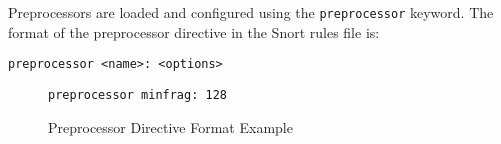 \documentclass[english]{report}
\newenvironment{note}{
\samepage
    \vspace{10pt}{\textsf{
        {\hspace{7pt}\Huge{$\triangle$\hspace{-12.5pt}{\Large{$^!$}}}}\hspace{5pt}
        {\Large{NOTE}}
    }
    }
   \begin{center}
    \par\vspace{-17pt}

    \begin{lrbox}{\savepar}
    \begin{minipage}[r]{6in}
}
{
    \end{minipage}
    \end{lrbox}
    \fbox{
        \usebox{
            \savepar
	}
    }
    \par\vskip10pt
    \end{center}
}
\newenvironment{note}{
        \begin{rawhtml}
        <p><table border="1"><tr><td><b>
        Note:&nbsp;&nbsp;</b>
        \end{rawhtml}
}{
        \begin{rawhtml}
        </b></td></tr></table></p>
        \end{rawhtml}
}
\begin{document}
Preprocessors are loaded and configured using the {\tt preprocessor} keyword.
The format of the preprocessor directive in the Snort rules file is:

\begin{verbatim}
preprocessor <name>: <options>
\end{verbatim}

\begin{figure}[!hbpt]
\begin{verbatim}
preprocessor minfrag: 128
\end{verbatim}

\caption{\label{Preprocessor Example}Preprocessor Directive Format Example}
\end{figure}



\end{document}
